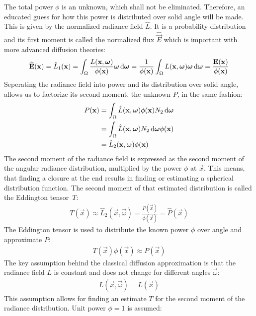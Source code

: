 The total power $\phi$ is an unknown, which shall not be eliminated. Therefore, an educated guess for how this power is distributed over solid angle will be made. This is given by the normalized radiance field $\hat{L}$. It is a probability distribution and its first moment is called the normalized flux $\widehat{\vec{E}}$ which is important with more advanced diffusion theories:
\begin{align*}
\widehat{\boldsymbol{\mathbf{E}}}(\boldsymbol{\mathbf{x}}) = \hat{L}_1(\boldsymbol{\mathbf{x}}) = \int_{\Omega}\frac{L(\boldsymbol{\mathbf{x}}, \boldsymbol{\mathbf{\omega}})}{\phi(\boldsymbol{\mathbf{x}})}\boldsymbol{\mathbf{\omega}}\,\mathrm{d}\boldsymbol{\mathbf{\omega}} = \frac{1}{\phi(\boldsymbol{\mathbf{x}})}\int_{\Omega}L(\boldsymbol{\mathbf{x}}, \boldsymbol{\mathbf{\omega}})\boldsymbol{\mathbf{\omega}}\,\mathrm{d}\boldsymbol{\mathbf{\omega}} = \frac{\boldsymbol{\mathbf{E}}(\boldsymbol{\mathbf{x}})}{\phi(\boldsymbol{\mathbf{x}})}
\end{align*}
Seperating the radiance field into power and its distribution over solid angle, allows us to factorize its second moment, the unknown $P$, in the same fashion:
\begin{align*}
P(\boldsymbol{\mathbf{x}}) &=
\int_{\Omega}{\hat{L}(\boldsymbol{\mathbf{x}}, \boldsymbol{\mathbf{\omega}})\phi(\boldsymbol{\mathbf{x}})N_2\,\mathrm{d}\boldsymbol{\mathbf{\omega}}}\\
&= \int_{\Omega}{\hat{L}(\boldsymbol{\mathbf{x}}, \boldsymbol{\mathbf{\omega}})N_2\,\mathrm{d}\boldsymbol{\mathbf{\omega}}}\phi(\boldsymbol{\mathbf{x}})\\
&= \hat{L}_2(\boldsymbol{\mathbf{x}}, \boldsymbol{\mathbf{\omega}})\phi(\boldsymbol{\mathbf{x}})
\end{align*}
The second moment of the radiance field is expressed as the second moment of the angular radiance distribution, multiplied by the power $\phi$ at $\vec{x}$. This means, that finding a closure at the end results in finding or estimating a spherical distribution function. The second moment of that estimated distribution is called the Eddington tensor~$T$:
\begin{align}
\label{eq:eddington_tensor}
T(\vec{x}) \approx \hat{L}_2(\vec{x}, \vec{\omega}) =
\frac{P(\vec{x})}{\phi(\vec{x})} =
\widehat{P}(\vec{x})
\end{align}
The Eddington tensor is used to distribute the known power $\phi$ over angle and approximate $P$:
\begin{align*}
T(\vec{x})\phi(\vec{x}) \approx 
P(\vec{x})
\end{align*}
The key assumption behind the classical diffusion approximation is that the radiance field $L$ is constant and does not change for different angles $\vec{\omega}$:
\begin{align*}
L(\vec{x}, \vec{\omega}) = L(\vec{x})
\end{align*}
This assumption allows for finding an estimate $T$ for the second moment of the radiance distribution. Unit power $\phi = 1$ is assumed:
